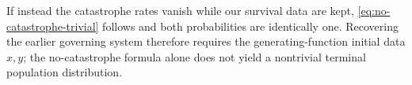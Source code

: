 If instead the catastrophe rates vanish while our survival data are kept, \cref{eq:no-catastrophe-trivial} follows and both probabilities are identically one. Recovering the earlier governing system therefore requires the generating-function initial data $x,y$; the no-catastrophe formula alone does not yield a nontrivial terminal population distribution.


\endgroup
